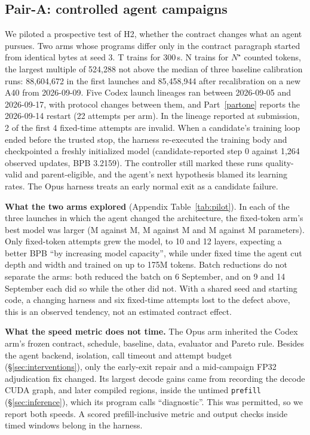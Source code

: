 \documentclass{article}
\newif\ifshowhumanmarkers \showhumanmarkersfalse
\newcommand{\humantag}[1]{{\color{humanframe}\sffamily\scriptsize\bfseries HUMAN AUTHOR MUST REWRITE/VERIFY [#1]}\ }
\newcommand{\humanauthor}[2][]{\ifshowhumanmarkers\begin{humanbox}\humantag{#1}#2\end{humanbox}\else #2\par\fi}
\begin{document}
\subsection{Pair-A: controlled agent campaigns}\label{sec:pilot}
\humanauthor[P2-15]{We piloted a prospective test of H2, whether the contract changes what an agent pursues. Two arms whose programs differ only in the contract paragraph started from identical bytes at seed 3. T trains for 300\,s. N trains for $N^\star$ counted tokens, the largest multiple of 524,288 not above the median of three baseline calibration runs: 88,604,672 in the first launches and 85,458,944 after recalibration on a new A40 from 2026-09-09. Five Codex launch lineages ran between 2026-09-05 and 2026-09-17, with protocol changes between them, and Part~\ref{partone} reports the 2026-09-14 restart (22 attempts per arm). In the lineage reported at submission, 2 of the first 4 fixed-time attempts are invalid. When a candidate's training loop ended before the trusted stop, the harness re-executed the training body and checkpointed a freshly initialized model (candidate-reported step 0 against 1,264 observed updates, BPB 3.2159). The controller still marked these runs quality-valid and parent-eligible, and the agent's next hypothesis blamed its learning rates. The Opus harness treats an early normal exit as a candidate failure.}
\humanauthor[P2-15b]{\textbf{What the two arms explored} (Appendix Table~\ref{tab:pilot}). In each of the three launches in which the agent changed the architecture, the fixed-token arm's best model was larger (\CRFivePilotNA M against \CRFivePilotTA M, \CRFivePilotNB M against \CRFivePilotTB M and \CRFivePilotNC M against \CRFivePilotTC M parameters). Only fixed-token attempts grew the model, to 10 and 12 layers, expecting a better BPB ``by increasing model capacity'', while under fixed time the agent cut depth and width and trained on up to 175M tokens. Batch reductions do not separate the arms: both reduced the batch on 6 September, and on 9 and 14 September each did so while the other did not. With a shared seed and starting code, a changing harness and six fixed-time attempts lost to the defect above, this is an observed tendency, not an estimated contract effect.}

\humanauthor[P2-16]{\textbf{What the speed metric does not time.} The Opus arm inherited the Codex arm's frozen contract, schedule, baseline, data, evaluator and Pareto rule. Besides the agent backend, isolation, call timeout and attempt budget (\S\ref{sec:interventions}), only the early-exit repair and a mid-campaign FP32 adjudication fix changed. Its largest decode gains came from recording the decode CUDA graph, and later compiled regions, inside the untimed \texttt{prefill} (\S\ref{sec:inference}), which its program calls ``diagnostic''. This was permitted, so we report both speeds. A scored prefill-inclusive metric and output checks inside timed windows belong in the harness.}
\label{parttwoend}
\end{document}
